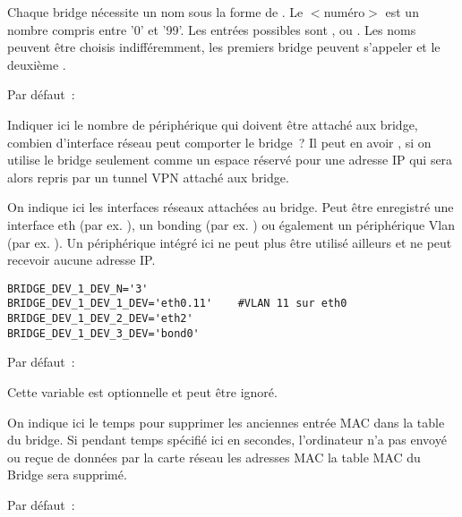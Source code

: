 \begin{description}
  Chaque bridge nécessite un nom sous la forme de . Le
  $<$numéro$>$ est un nombre compris entre '0' et '99'. Les entrées possibles sont
  ,  ou . Les noms peuvent être choisis
  indifféremment, les premiers bridge peuvent s'appeler  et le deuxième .


  Par défaut~: 

  Indiquer ici le nombre de périphérique qui doivent être attaché aux bridge,
  combien d'interface réseau peut comporter le bridge~? Il peut en avoir
  , si on utilise le bridge seulement comme un espace réservé pour
  une adresse IP qui sera alors repris par un tunnel VPN attaché aux bridge.


  On indique ici les interfaces réseaux attachées au bridge. Peut être enregistré
  une interface eth (par ex. ), un bonding (par ex. ) ou
  également un périphérique Vlan (par ex. ). Un périphérique intégré
  ici ne peut plus être utilisé ailleurs et ne peut recevoir aucune adresse IP.

\begin{example}
\begin{verbatim}
BRIDGE_DEV_1_DEV_N='3'
BRIDGE_DEV_1_DEV_1_DEV='eth0.11'	#VLAN 11 sur eth0
BRIDGE_DEV_1_DEV_2_DEV='eth2'
BRIDGE_DEV_1_DEV_3_DEV='bond0'
\end{verbatim}
\end{example}


  Par défaut~: 

  Cette variable est optionnelle et peut être ignoré.

  On indique ici le temps pour supprimer les anciennes entrée MAC dans
  la table du bridge. Si pendant temps spécifié ici en secondes, l'ordinateur
  n'a pas envoyé ou reçue de données par la carte réseau les adresses MAC
  la table MAC du Bridge sera supprimé.


  Par défaut~: 


\end{description}
